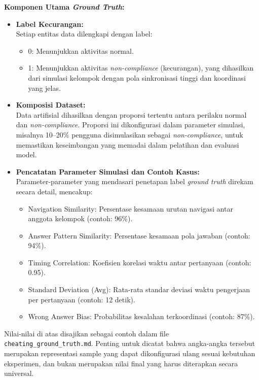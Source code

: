 \textbf{Komponen Utama \textit{Ground Truth}:}
\begin{itemize}
    \item \textbf{Label Kecurangan:} \\
    Setiap entitas data dilengkapi dengan label:
    \begin{itemize}
        \item 0: Menunjukkan aktivitas normal.
        \item 1: Menunjukkan aktivitas \textit{non-compliance} (kecurangan), yang dihasilkan dari simulasi kelompok dengan pola sinkronisasi tinggi dan koordinasi yang jelas.
    \end{itemize}
    \item \textbf{Komposisi Dataset:} \\
    Data artifisial dihasilkan dengan proporsi tertentu antara perilaku normal dan \textit{non-compliance}. Proporsi ini dikonfigurasi dalam parameter simulasi, misalnya 10--20\% pengguna disimulasikan sebagai \textit{non-compliance}, untuk memastikan keseimbangan yang memadai dalam pelatihan dan evaluasi model.
    \item \textbf{Pencatatan Parameter Simulasi dan Contoh Kasus:} \\
    Parameter-parameter yang mendasari penetapan label \textit{ground truth} direkam secara detail, mencakup:
    \begin{itemize}
        \item Navigation Similarity: Persentase kesamaan urutan navigasi antar anggota kelompok (contoh: 96\%).
        \item Answer Pattern Similarity: Persentase kesamaan pola jawaban (contoh: 94\%).
        \item Timing Correlation: Koefisien korelasi waktu antar pertanyaan (contoh: 0.95).
        \item Standard Deviation (Avg): Rata-rata standar deviasi waktu pengerjaan per pertanyaan (contoh: 12 detik).
        \item Wrong Answer Bias: Probabilitas kesalahan terkoordinasi (contoh: 87\%).
    \end{itemize}
\end{itemize}

Nilai-nilai di atas disajikan sebagai contoh dalam file \texttt{cheating\_ground\_truth.md}. Penting untuk dicatat bahwa angka-angka tersebut merupakan representasi sample yang dapat dikonfigurasi ulang sesuai kebutuhan eksperimen, dan bukan merupakan nilai final yang harus diterapkan secara universal.

